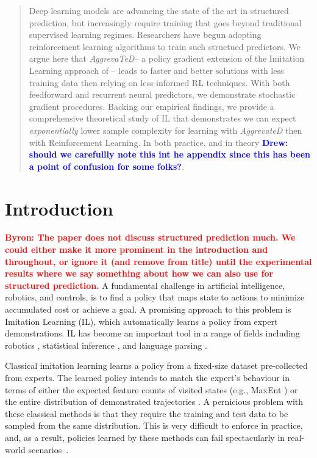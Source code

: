 \documentclass{article}
\newcommand{\BB}[1]{\textcolor{red}{\bf Byron: {#1}}}
\newcommand{\drew}[1]{\textcolor{blue}{\bf Drew: {#1}}}
\begin{document}
\begin{abstract}
Deep learning models are advancing the state of the art in structured prediction, but increasingly require training that goes beyond traditional supervised learning regimes. \cite{} Researchers have begun adopting reinforcement learning algorithms to train such structued predictors. We argue here that \textit{AggrevaTeD}-- a policy gradient extension of the Imitation Learning approach of \cite{Ross}-- leads to faster and better solutions with less training data then relying on less-informed RL techniques.  With both feedforward and recurrent neural predictors, we demonstrate stochastic gradient procedures. Backing our empirical findings, we provide a comprehensive theoretical study of IL that demonstrates we can expect \textit{exponentially} lower sample complexity for learning with \textit{AggrevateD} then with Reinforcement Learning. In both practice, and in theory \drew{should we carefullly note this int he appendix since this has been a point of confusion for some folks?}. 
\end{abstract}



\section{Introduction}
\label{sec:intro}
\BB{The paper does not discuss structured prediction much. We could either make it more prominent in the introduction and throughout, or ignore it (and remove from title) until the experimental results where we say something about how we can also use for structured prediction.}
A fundamental challenge in artificial intelligence, robotics, and controls, is to find a policy that maps state to actions to minimize accumulated cost or achieve a goal. A promising approach to this problem is Imitation Learning (IL), which automatically learns a policy from expert demonstrations.  IL has become an important tool in a range of fields including robotics \cite{Ross2011_AISTATS}, statistical inference \cite{ross2011_CVPR,sun2016learning}, and language parsing \cite{chang2015learning_dependency}. 

Classical imitation learning \cite{abbeel2004apprenticeship,syed2008apprenticeship,ziebart2008maximum,finn2016guided,ho2016generative} learns a policy from a fixed-size dataset pre-collected from experts. The learned policy intends to match the expert's behaviour in terms of either the expected feature counts of visited states (e.g., MaxEnt \cite{ziebart2008maximum}) or the entire distribution of demonstrated trajectories \cite{ho2016generative}. A pernicious problem with these classical methods is that they require the training and test data to be sampled from the same distribution.  This is very difficult to enforce in practice, and, as a result, policies learned by these methods can fail spectacularly in real-world scenarios~\cite{ross2010efficient}.
\end{document}
